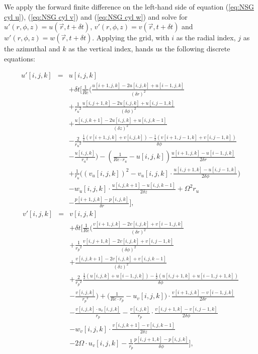 \documentclass[12pt, a4paper]{article} %
\begin{document}
			We apply the forward finite difference on the left-hand side of equation (\ref{eq:NSG cyl u}), (\ref{eq:NSG cyl v}) and (\ref{eq:NSG cyl w}) and solve for $u'(r,\phi,z) = u(\vec{r}, t+\delta t)$, $v'(r,\phi,z) = v(\vec{r}, t+\delta t)$ and $w'(r,\phi,z) = w(\vec{r}, t+\delta t)$. Applying the grid, with $i$ as the radial index, $j$ as the azimuthal and $k$ as the vertical index, hands us the following discrete equations:
			
			\begin{eqnarray}
				u'[i,j,k] &=& u[i,j,k]	\nonumber \\
				&& +\delta t \Bigg[\frac{1}{Re}\bigg(\frac{u[i+1,j,k]-2u[i,j,k]+u[i-1,j,k]}{(\delta r)^2}	\nonumber \\
				&& + \frac{1}{{r_u}^2}\frac{u[i,j+1,k]-2u[i,j,k]+u[i,j-1,k]}{(\delta \phi)^2}	\nonumber \\
				&& + \frac{u[i,j,k+1] - 2u[i,j,k] +u[i,j,k-1]}{(\delta z)^2}	\nonumber \\
				&& - \frac{2}{{r_u}^2}\frac{\frac{1}{2}\left(v[i+1,j,k]+v[i,j,k]\right)-\frac{1}{2}\left(v[i+1,j-1,k]+v[i,j-1,k]\right)}{\delta \phi}	\nonumber \\
				&& - \frac{u[i,j,k]}{{r_u}^2}\bigg) - \left(\frac{1}{Re\cdot r_u} - u[i,j,k]\right)\frac{u[i+1,j,k]-u[i-1,j,k]}{2\delta r}	\nonumber \\
				&& + \frac{1}{r_u}\bigg(\left(v_u[i,j,k]\right)^2 - v_u[i,j,k] \cdot \frac{u[i,j+1,k]-u[i,j-1,k]}{2\delta \phi}\bigg)	\nonumber \\
				&& - w_u[i,j,k] \cdot \frac{u[i,j,k+1]-u[i,j,k-1]}{2\delta z} + \Omega^2 r_u	\nonumber \\
				&& - \frac{p[i+1,j,k]-p[i,j,k]}{\delta r} \Bigg] ,
				\label{eq:Discrete u}
			\end{eqnarray}
			\begin{eqnarray}
				v'[i,j,k] &=& v[i,j,k]	\nonumber \\
				&& + \delta t \Bigg[ \frac{1}{Re} \bigg( \frac{v[i+1,j,k]-2 v[i,j,k]+v[i-1,j,k]}{(\delta r)^2}	\nonumber \\
				&& + \frac{1}{{r_p}^2} \frac{v[i,j+1,k]-2v[i,j,k]+v[i,j-1,k]}{(\delta \phi)^2}	\nonumber \\
				&& + \frac{v[i,j,k+1]-2v[i,j,k]+v[i,j,k-1]}{(\delta z)^2}	\nonumber \\
				&& + \frac{2}{{r_p}^2} \frac{\frac{1}{2}\left(u[i,j,k]+u[i-1,j,k]\right)-\frac{1}{2}\left(u[i,j+1,k]+u[i-1,j+1,k]\right)}{\delta\phi} \nonumber \\
				&& - \frac{v[i,j,k]}{{r_p}^2} \bigg) + \bigg( \frac{1}{Re\cdot r_p} - u_v[i,j,k] \bigg) \cdot \frac{v[i+1,j,k]-v[i-1,j,k]}{2\delta r} \nonumber \\
				&& - \frac{v[i,j,k] \cdot u_v[i,j,k]}{r_p} - \frac{v[i,j,k]}{r_p}\cdot \frac{v[i,j+1,k]-v[i,j-1,k]}{2\delta \phi} \nonumber \\
				&& - w_v[i,j,k] \cdot \frac{v[i,j,k+1]-v[i,j,k-1]}{2\delta z} \nonumber \\
				&& - 2\Omega\cdot u_v[i,j,k] - \frac{1}{r_p} \frac{p[i,j+1,k]-p[i,j,k]}{\delta \phi}
				\Bigg] ,
				\label{eq:Discrete v}
			\end{eqnarray}
						
\end{document}
